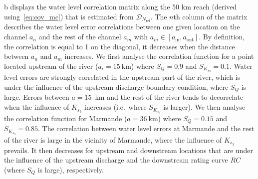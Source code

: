 b displays the water level correlation matrix along the 50 km reach (derived using~\cref{eq:cov_mc}) that is estimated from $\mathcal{D}_{N_{\text{ref}}}$. The $n$th column of the matrix describes the water level error correlations between one given location on the channel $a_n$ and the rest of the channel $a_m$ with $a_m \in [a_{\text{in}}, a_{\text{out}}]$. By definition, the correlation is equal to 1 on the diagonal, it decreases when the distance between $a_n$ and $a_m$ increases. We first analyse the correlation function for a point located upstream of the river ($a_i = 15~\text{km}$) where $S_Q = 0.9$ and $S_{K_{s_3}}= 0.1$. Water level errors are strongly correlated in the upstream part of the river, which is under the influence of the upstream discharge boundary condition, where $S_Q$ is large. Errors between $a = 15$~km and the rest of the river tends to decorrelate when the influence of $K_{s_3}$ increases (i.e.~where $S_{K_{s_3}}$ is larger). We then analyse the correlation function for Marmande ($a = 36~\text{km}$) where $S_Q= 0.15$ and $S_{K_{s_3}}= 0.85$. The correlation between water level errors at Marmande and the rest of the river is large in the vicinity of Marmande, where the influence of $K_{s_3}$ prevails. It then decreases for upstream and downstream locations that are under the influence of the upstream discharge and the downstream rating curve $RC$ (where $S_Q$ is large), respectively.
